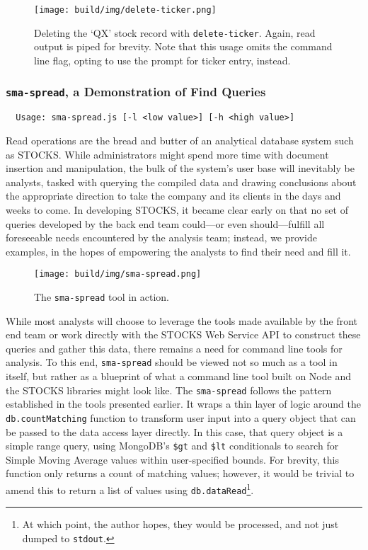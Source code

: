 \documentclass[
11pt,
titlepage,
]{article}
\begin{document}
\begin{figure}[tbp]
  \texttt{[image: build/img/delete-ticker.png]}
  \caption{Deleting the `QX' stock record with \texttt{delete-ticker}. Again,
    read output is piped for brevity. Note that this usage omits the command
    line flag, opting to use the prompt for ticker entry, instead.}
  \label{fig:delete-ticker}
\end{figure}

\subsubsection{\texttt{sma-spread}, a Demonstration of Find Queries}

\begin{lstlisting}
  Usage: sma-spread.js [-l <low value>] [-h <high value>]
\end{lstlisting}

Read operations are the bread and butter of an analytical database system such
as STOCKS. While administrators might spend more time with document insertion
and manipulation, the bulk of the system's user base will inevitably be
analysts, tasked with querying the compiled data and drawing conclusions about
the appropriate direction to take the company and its clients in the days and
weeks to come. In developing STOCKS, it became clear early on that no set of
queries developed by the back end team could---or even should---fulfill all
foreseeable needs encountered by the analysis team; instead, we provide
examples, in the hopes of empowering the analysts to find their need and fill it.

\begin{figure}[bp]
  \texttt{[image: build/img/sma-spread.png]}
  \caption{The \texttt{sma-spread} tool in action.}
  \label{fig:sma-spread}
\end{figure}

While most analysts will choose to leverage the tools made available by the
front end team or work directly with the STOCKS Web Service API to construct
these queries and gather this data, there remains a need for command line tools
for analysis. To this end, \texttt{sma-spread} should be viewed not so much as a
tool in itself, but rather as a blueprint of what a command line tool built on
Node and the STOCKS libraries might look like. The \texttt{sma-spread} follows
the pattern established in the tools presented earlier. It wraps a thin layer of
logic around the \texttt{db.countMatching} function to transform user input into
a query object that can be passed to the data access layer directly. In this
case, that query object is a simple range query, using MongoDB's \texttt{\$gt}
and \texttt{\$lt} conditionals to search for Simple Moving Average values within
user-specified bounds. For brevity, this function only returns a count of
matching values; however, it would be trivial to amend this to return a list of
values using \texttt{db.dataRead}\footnote{At which point, the author hopes,
they would be processed, and not just dumped to \texttt{stdout}.}.
\end{document}
